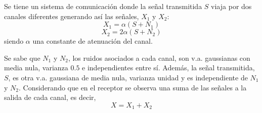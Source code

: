 \ifspanish

\question[25]  %

Se tiene un sistema de comunicación donde la señal transmitida $S$ viaja por dos canales diferentes generando así las señales, $X_1$ y $X_2$:
$$X_1 = \alpha ( S +N_1)$$
$$X_2 = 2 \alpha ( S +N_2)$$
siendo $\alpha$ una constante de atenuación del canal. 

Se sabe que $N_1$ y $N_2$, los ruidos asociados a cada canal, son v.a. gaussianas con media nula, varianza $0.5$ e independientes entre sí. Además, la señal transmitida, $S$, es otra v.a. gaussiana de media nula, varianza unidad y es independiente de $N_1$ y $N_2$. Considerando que en el receptor se observa una suma de las señales a la salida de cada canal, es decir,
$$X= X_1 + X_2$$

